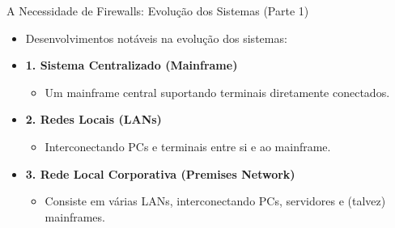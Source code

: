 \begin{frame}{A Necessidade de Firewalls: Evolução dos Sistemas (Parte 1)}
    \begin{itemize}
        \item Desenvolvimentos notáveis na evolução dos sistemas:

        \item \textbf{1. Sistema Centralizado (Mainframe)}
              \begin{itemize}
                  \item Um mainframe central suportando terminais diretamente conectados.
              \end{itemize}

        \item \textbf{2. Redes Locais (LANs)}
              \begin{itemize}
                  \item Interconectando PCs e terminais entre si e ao mainframe.
              \end{itemize}

        \item \textbf{3. Rede Local Corporativa (Premises Network)}
              \begin{itemize}
                  \item Consiste em várias LANs, interconectando PCs, servidores e (talvez) mainframes.
              \end{itemize}
    \end{itemize}
\end{frame}

